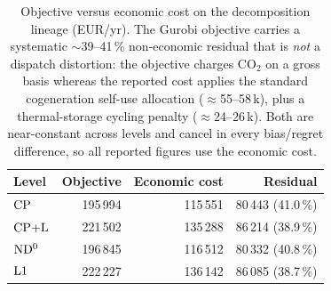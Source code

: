 \begin{table}[t]
\centering
\caption{Objective versus economic cost on the decomposition lineage (EUR/yr). The Gurobi
objective carries a systematic $\sim$39--41\,\% non-economic residual that is \emph{not} a
dispatch distortion: the objective charges CO$_2$ on a gross basis whereas the reported cost
applies the standard cogeneration self-use allocation ($\approx$55--58\,k), plus a
thermal-storage cycling penalty ($\approx$24--26\,k). Both are near-constant across levels and
cancel in every bias/regret difference, so all reported figures use the economic cost.}
\label{tab:objdecomp}
\begin{tabular}{lrrr}
\hline
Level & Objective & Economic cost & Residual \\
\hline
$\mathrm{CP}$   & 195\,994 & 115\,551 & 80\,443 (41.0\,\%) \\
$\mathrm{CP{+}L}$  & 221\,502 & 135\,288 & 86\,214 (38.9\,\%) \\
$\mathrm{ND^{0}}$  & 196\,845 & 116\,512 & 80\,332 (40.8\,\%) \\
$\mathrm{L1}$ & 222\,227 & 136\,142 & 86\,085 (38.7\,\%) \\
\hline
\end{tabular}
\end{table}
